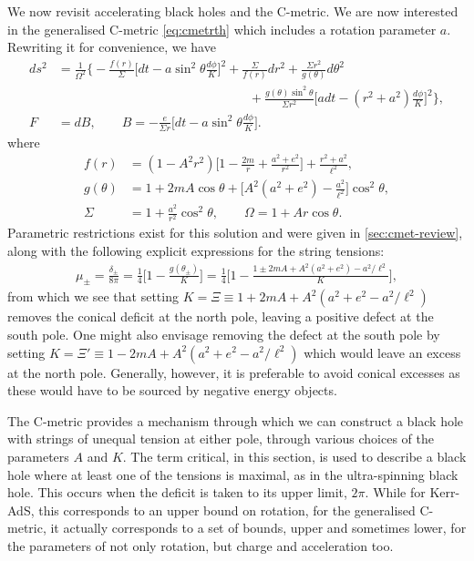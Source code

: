 \documentclass[
twoside,
openright,
frontopenright,
]{dmathesis}
\newcommand{\nn}{\nonumber}
\begin{document}
We now revisit accelerating black holes and the C-metric. We are now interested
in the generalised C-metric \eqref{eq:cmetrth} which includes a rotation
parameter $a$. Rewriting it for convenience, we have
\begin{align}
  ds^2 &= \frac{1}{\Omega^2}\bigg\{ -\frac{f(r)}{\Sigma}\Big[dt - a\sin^2\theta
         \frac{d\phi}{K} \Big]^2 + \frac{\Sigma}{f(r)}dr^2 + \frac{\Sigma
         r^2}{g(\theta)}d\theta^2 \nn\\
  &\hspace{15em} + \frac{g(\theta) \sin^2\theta}{\Sigma r^2} \Big[adt-(r^2+a^2)
    \frac{d\phi}{K}\Big]^2\bigg\},\nn\\ 
  F&=dB,\qquad B=-\frac{e}{\Sigma r}\Big[dt-a\sin^2\theta \frac{d\phi}{K}\Big].
\label{eq:cmetric4}
\end{align}
where
\begin{align}
f(r)&=(1-A^2r^2)\bigg[1-\frac{2m}{r}+\frac{a^2+e^2}{r^2}\bigg]+\frac{r^2+a^2}{\ell^2},\nn\\
g(\theta) &=
1+2mA\cos\theta+\bigg[A^2(a^2+e^2)-\frac{a^2}{\ell^2}\bigg]\cos^2\theta,\nn\\ 
\Sigma&=1+\frac{a^2}{r^2}\cos^2\theta, \qquad \Omega=1+Ar\cos\theta.
\label{eq:cmetric4-fun}
\end{align}
Parametric restrictions exist for this solution and were given in
\cref{sec:cmet-review}, along with the following explicit expressions for the
string tensions:
\begin{align}
  \label{eq:tensions}
  \mu_\pm = \frac{\delta_\pm}{8\pi}=\frac14\bigg[1-\frac{g(\theta_\pm)}{K}\bigg] =
  \frac14\bigg[1-\frac{1\pm 2mA + A^2(a^2+e^2)-a^2/\ell^2}{K}\bigg], 
\end{align}
from which we see that setting
$K = \Xi \equiv 1 + 2mA + A^2(a^2 + e^2 - a^2/\ell^2)$ removes the conical
deficit at the north pole, leaving a positive defect at the south pole. One
might also envisage removing the defect at the south pole by setting
$K = \Xi' \equiv 1 - 2mA + A^2(a^2 + e^2 - a^2/\ell^2)$ which would leave an
excess at the north pole. Generally, however, it is preferable to avoid conical
excesses as these would have to be sourced by negative energy objects.

The C-metric provides a mechanism through which we can construct a black hole
with strings of unequal tension at either pole, through various choices of the
parameters $A$ and $K$. The term critical, in this section, is used to describe
a black hole where at least one of the tensions is maximal, as in the
ultra-spinning black hole. This occurs when the deficit is taken to its upper
limit, $2\pi$. While for Kerr-AdS, this corresponds to an upper bound on
rotation, for the generalised C-metric, it actually corresponds to a set of
bounds, upper and sometimes lower, for the parameters of not only rotation, but
charge and acceleration too.
\end{document}
